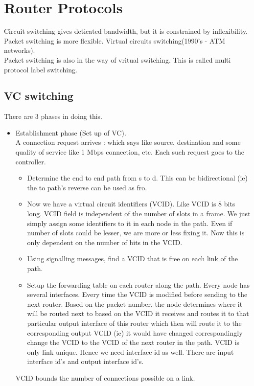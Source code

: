 \documentclass[solution,addpoints,12pt]{exam}
\begin{document}
\section{Router Protocols}

Circuit switching gives deticated bandwidth, but it is constrained by
inflexibility. Packet switching is more flexible. Virtual circuits switching(1990's - ATM networks).\\
Packet switching is also in the way of vritual switching. This is called
multi protocol label switching.

\subsection{VC switching}
There are 3 phases in doing this.
\begin{itemize}
\item Establishment phase (Set up of VC).\\
A connection request arrives : which says like
source, destination and some quality of service like 1 Mbps
connection, etc. Each such request goes to the controller.\\
\begin{itemize}
\item Determine the end to end path from s to d. This can be bidirectional
(ie) the to path's reverse can be used as fro.
\item Now we have a virtual circuit identifiers (VCID). Like VCID is 8 bits
long. VCID field is independent of the number of slots in a frame. We just
simply assign some identifiers to it in each node in the path.
Even if number of slots could be lesser, we are more or less fixing it. Now
this is only dependent on the number of bits in the VCID.
\item Using signalling messages, find a VCID that is free on each link of
the path.
\item Setup the forwarding table on each router along the path. Every
node has several interfaces. Every time the VCID is modified
before sending to the next router. Based on the packet number, the node
determines where it will be routed next to based on the VCID it receives
and routes it to that particular output interface of this router which
then will route it to the corresponding output VCID (ie) it would have
changed correspondingly change the VCID
to the VCID of the next router in the path. VCID is only link unique.
Hence we need interface id as well. There are input interface id's and output interface id's.\\
\end{itemize}
VCID bounds the number of connections possible on a link.\\


\end{itemize}
\end{document}
